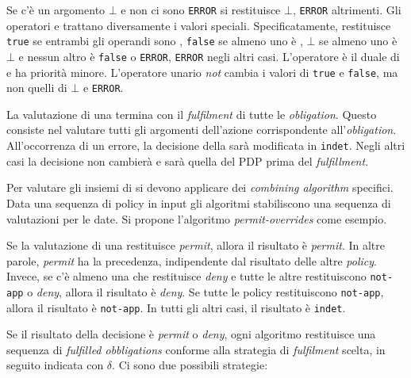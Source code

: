Se c'è un argomento $\bot$ e non ci sono \texttt{ERROR} si restituisce $\bot$, \texttt{ERROR} altrimenti.
Gli operatori \eand e \eor trattano diversamente i valori speciali. Specificatamente, \eand restituisce \texttt{true} se entrambi
gli operandi sono \etrue, \texttt{false} se almeno uno è \efalse, $\bot$ se almeno uno è $\bot$ e nessun altro è
\texttt{false} o \texttt{ERROR}, \texttt{ERROR} negli altri casi. L'operatore \eor è il duale di \eand e ha priorità minore.
L'operatore unario \emph{not} cambia i valori di \texttt{true} e \texttt{false}, ma non quelli di $\bot$ e \texttt{ERROR}.\par
La valutazione di una \epolicy termina con il \emph{fulfilment} di tutte le \emph{obligation}. Questo consiste nel valutare
tutti gli argomenti dell'azione corrispondente all'\emph{obligation}. All'occorrenza di un errore, la decisione della \epolicy
sarà modificata in \texttt{indet}.
Negli altri casi la decisione non cambierà e sarà quella del \ac{PDP} prima del \emph{fulfillment}.\par
Per valutare gli insiemi di \epolicy si devono applicare dei \emph{combining algorithm} specifici. Data una sequenza di
policy in input gli algoritmi stabiliscono una sequenza di valutazioni per le \epolicy date. Si propone l'algoritmo
\emph{permit-overrides} come esempio.
\begin{description}[labelindent=5pt,style=multiline,leftmargin=3cm]
\item[permit-overrides]
                        Se la valutazione di una \epolicy restituisce \emph{permit}, allora il risultato è \emph{permit}.
                        In altre parole, \emph{permit} ha la precedenza, indipendente dal risultato delle altre \emph{policy}.
                        Invece, se c'è almeno una \epolicy che restituisce \emph{deny} e tutte le altre restituiscono
                        \texttt{not-app} o \emph{deny}, allora il risultato è \emph{deny}. Se tutte le policy restituiscono
                        \texttt{not-app}, allora il risultato è \texttt{not-app}. In tutti gli altri casi, il risultato è \texttt{indet}.
\end{description}
Se il risultato della decisione è \emph{permit} o \emph{deny}, ogni algoritmo restituisce una sequenza di \emph{fulfilled obbligations}
conforme alla strategia di \emph{fulfilment} scelta, in seguito indicata con $\delta$. Ci sono due possibili strategie:
